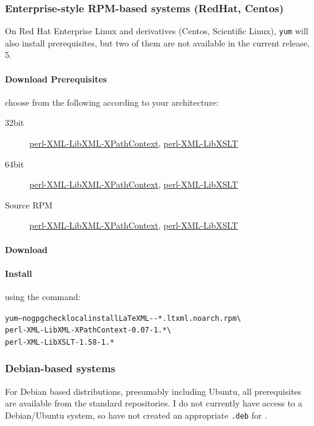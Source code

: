 \documentclass{article}
\begin{document}
\subsubsection[Enterprise systems]{Enterprise-style RPM-based systems (RedHat, Centos)}\label{install.enterprise}
On Red Hat Enterprise Linux and derivatives (Centos, Scientific Linux), \texttt{yum} will also
install prerequisites, but two of them are not available in the current release, 5.
\paragraph{Download Prerequisites} choose from the following according to your architecture:
\begin{description}
\item[32bit]
   \href{releases/perl-XML-LibXML-XPathContext-0.07-1.c5.ltxml.i386.rpm}{perl-XML-LibXML-XPathContext},
   \href{releases/perl-XML-LibXSLT-1.58-1.c5.ltxml.i386.rpm}{perl-XML-LibXSLT}
\item[64bit]
   \href{releases/perl-XML-LibXML-XPathContext-0.07-1.c5.ltxml.x86_64.rpm}{perl-XML-LibXML-XPathContext},
   \href{releases/perl-XML-LibXSLT-1.58-1.c5.ltxml.x86_64.rpm}{perl-XML-LibXSLT}
\item[Source RPM]
    \href{releases/perl-XML-LibXML-XPathContext-0.07-1.c5.ltxml.src.rpm}{perl-XML-LibXML-XPathContext},
    \href{releases/perl-XML-LibXSLT-1.58-1.c5.ltxml.src.rpm}{perl-XML-LibXSLT}
\end{description}
\paragraph{Download} \CurrentCentos
\paragraph{Install} using the command:
\begin{alltt}
   yum --nogpgcheck localinstall LaTeXML-\CurrentVersion-*.ltxml.noarch.rpm \textbackslash\\
       perl-XML-LibXML-XPathContext-0.07-1.*   \textbackslash\\
       perl-XML-LibXSLT-1.58-1.*
\end{alltt}

\subsubsection{Debian-based systems}\label{install.debian}
For Debian based distributions, presumably including Ubuntu,
all prerequisites are available from the standard repositories.
I do not currently have access to a Debian/Ubuntu system, so
have not created an appropriate \texttt{.deb} for \LaTeXML.
\end{document}
